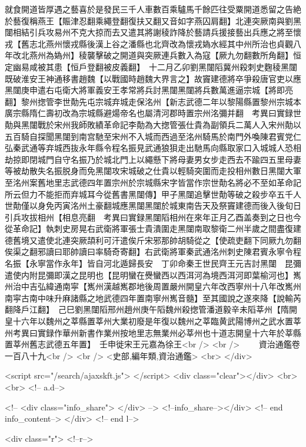 就食開道皆厚遇之藝喜於是發民三千人車數百乘驢馬千餘匹往受粟開道悉留之告絶於藝復稱燕王【賑津忍翻乘繩登翻復扶又翻又音如字燕囚肩翻】北連突厥南與劉黑闥相結引兵攻易州不克大掠而去又遣其將謝稜詐降於藝請兵援接藝出兵應之將至懷戎【舊志北燕州懷戎縣後漢上谷之潘縣也北齊改為懷戎媯水經其中州所治也貞觀八年改北燕州為媯州】稜襲擊破之開道與突厥連兵數入為寇【厥九勿翻數所角翻】恒定幽易咸被其患【恒戶登翻被皮義翻】　十二月乙卯劉黑闥䧟冀州殺刺史麴稜黑闥既破淮安王神通移書趙魏【以戰國時趙魏大界言之】故竇建德將卒爭殺唐官吏以應黑闥庚申遣右屯衛大將軍義安王孝常將兵討黑闥黑闥將兵數萬進逼宗城【將即亮翻】黎州揔管李世勣先屯宗城弃城走保洺州【新志武德二年以黎陽縣置黎州宗城本廣宗縣隋仁壽初改為宗城縣避煬帝名也屬清河郡時置宗州洺彌并翻　考異曰實録世勣與黑闥戰於宋州我師敗績革命記李勣為大揔管張仕貴為副領兵二萬人入宋州勣以五百騎自探聞黑闥到南宫馳至宋州不入城而西過至洺州騎馬於南門外喚陳君賓党仁弘秦武通等弃城西抜永年縣令程名振見武通狼狽走出馳馬向縣取家口入城城人恐相劫掠即閉城門自守名振乃於城北門上以繩懸下將母妻男女步走西去不踰四五里母妻等被劫散失名振脱身而免黑闥攻宋城破之仕貴以輕騎突圍而走投相州數日黑闥大軍至洺州案舊地里志武德四年置宗州於宗城縣宋字皆當作宗世勣名將必不至如革命記所云但力不能拒而弃城耳今從舊書黑闥傳】甲子黑闥追擊世勣等破之殺步卒五千人世勣僅以身免丙寅洺州土豪翻城應黑闥黑闥於城東南告天及祭竇建德而後入後旬日引兵攻拔相州【相息亮翻　考異曰實録黑闥䧟相州在來年正月乙酉盖奏到之日也今從革命記】執刺史房晃右武衛將軍張士貴潰圍走黑闥南取黎衛二州半歲之間盡復建德舊境又遣使北連突厥頡利可汗遣俟斤宋邪那帥胡騎從之【使疏吏翻下同厥九勿翻俟渠之翻邪讀曰耶帥讀曰率騎奇寄翻】右武衛將軍秦武通洺州刺史陳君賓永寧令程名振【永寧當作永年】皆自河北遁歸長安　丁卯命秦王世民齊王元吉討黑闥　昆彌遣使内附昆彌即漢之昆明也【昆明蠻在㸑蠻西以西洱河為境西洱河即葉榆河也】嶲州治中吉弘緯通南寜【嶲州漢越嶲郡地後周置嚴州開皇六年改西寧州十八年改嶲州南寜古南中味升麻諸縣之地武德四年置南寧州嶲音髓】至其國說之遂來降【說輸芮翻降戶江翻】　己巳劉黑闥䧟邢州趙州庚午䧟魏州殺揔管潘道毅辛未䧟莘州【隋開皇十六年以魏州之莘縣置莘州大業初廢是年復以魏州之莘臨黄武陽博州之武水置莘州考異曰實録作華州新書作業州按地里志無業州必莘州也十道志開皇十六年於莘縣置莘州舊志武德五年置】　壬申徙宋王元嘉為徐王<br />
<br />
　　資治通鑑卷一百八十九<br />
<br />
<史部,編年類,資治通鑑>  <br>
   </div> 

<script src="/search/ajaxskft.js"> </script>
 <div class="clear"></div>
<br>
<br>
 <!-- a.d-->

 <!--
<div class="info_share">
</div> 
-->
 <!--info_share--></div>   <!-- end info_content-->
  </div> <!-- end l-->

<div class="r">   <!--r-->



